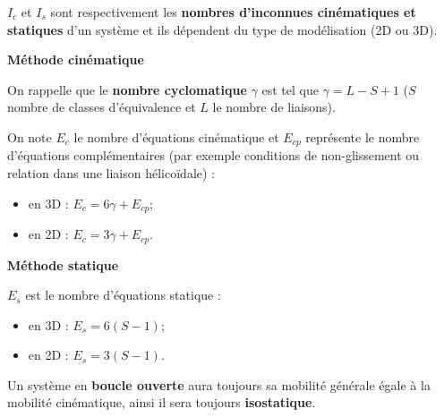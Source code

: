 \documentclass[10pt,fleqn]{article} %
\begin{document}
\begin{definition}[Notations]

$I_c$ et $I_s$ sont respectivement les \textbf{nombres d'inconnues cinématiques et statiques} d'un système et ils dépendent du type de modélisation (2D ou 3D).




\vspace{-.6cm}

\begin{multicols}{2}
\begin{center}
\textbf{Méthode cinématique}
\end{center}


On rappelle que le \textbf{nombre cyclomatique}  $\gamma$
est tel que $\gamma=L-S+1$ ($S$ nombre de classes d'équivalence et $L$ le nombre de liaisons).

On note $E_c$ le nombre d'équations cinématique et $E_{cp}$ représente le nombre d'équations complémentaires (par exemple conditions de non-glissement ou relation dans une liaison hélicoïdale) :
\begin{itemize}
 \item en 3D : $E_c=6\gamma+E_{cp}$;
 \item en 2D : $E_c=3\gamma+E_{cp}$.
\end{itemize}

\vfill\null
\columnbreak

\begin{center}
\textbf{Méthode statique} 
\end{center}


$E_s$ est le nombre d'équations statique :
				\begin{itemize}
					\item en 3D : $E_s=6 (S-1)$;
					\item en 2D : $E_s=3 (S-1)$.
				\end{itemize}


\end{multicols}



		
\end{definition}

\begin{rem}
Un système en \textbf{boucle ouverte} aura toujours sa mobilité générale égale à la mobilité cinématique, ainsi il sera toujours \textbf{isostatique}.
\end{rem}
\end{document}
